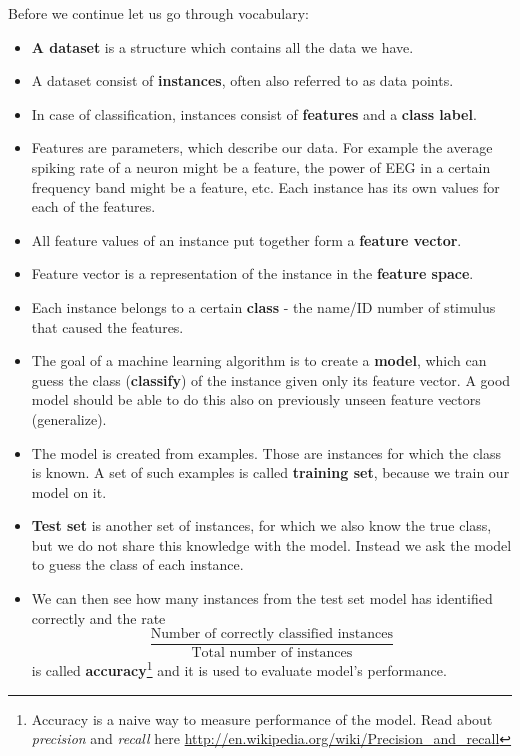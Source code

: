 \documentclass[a4paper,11pt]{article}
\begin{document}
%
%
Before we continue let us go through vocabulary:
\begin{itemize}
\itemsep 0em
	\item \textbf{A dataset} is a structure which contains all the data we have.
	\item A dataset consist of \textbf{instances}, often also referred to as data points.
	\item In case of classification, instances consist of \textbf{features} and a \textbf{class label}.
	\item Features are parameters, which describe our data. For example the average spiking rate of a neuron might be a feature, the power of EEG in a certain frequency band might be a feature, etc. Each instance has its own values for each of the features.
	\item All feature values of an instance put together form a \textbf{feature vector}.
	\item Feature vector is a representation of the instance in the \textbf{feature space}.
	\item Each instance belongs to a certain \textbf{class} - the name/ID number of stimulus that caused the features. 
	\item The goal of a machine learning algorithm is to create a \textbf{model}, which can guess the class (\textbf{classify}) of the instance given only its feature vector. A good model should be able to do this also on previously unseen feature vectors (generalize).
	\item The model is created from examples. Those are instances for which the class is known. A set of such examples is called \textbf{training set}, because we train our model on it.
	\item \textbf{Test set} is another set of instances, for which we also know the true class, but we do not share this knowledge with the model. Instead we ask the model to guess the class of each instance.
	\item We can then see how many instances from the test set model has identified correctly and the rate $$\displaystyle\frac{\text{Number of correctly classified instances}}{\text{Total number of instances}}$$ is called \textbf{accuracy}\footnote{Accuracy is a naive way to measure performance of the model. Read about \emph{precision} and \emph{recall} here \url{http://en.wikipedia.org/wiki/Precision_and_recall}} and it is used to evaluate model's performance.
\end{itemize}
\end{document}
